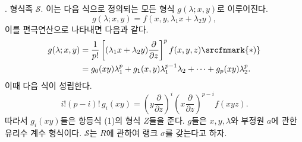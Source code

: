 
. 형식족 $\mathcal S$. 이는 다음 식으로 정의되는 모든 형식 $g(\lambda;x,y)$로 이루어진다.
\[
  g(\lambda;x,y)=f(x,y,\lambda_1x+\lambda_2y),
\]
이를 편극연산으로 나타내면 다음과 같다.
\[
\begin{aligned}
  g(\lambda;x,y)
  &=\frac1{p!}\left[(\lambda_1x+\lambda_2y)\frac{\partial}{\partial z}\right]^p f(x,y,z)\srcfnmark{*)} \\
  &=g_0(xy)\lambda_1^p+g_1(x,y)\lambda_1^{p-1}\lambda_2+\cdots+g_p(xy)\lambda_2^p.
\end{aligned}
\]
이때 다음 식이 성립한다.
\[
  i!(p-i)!\,g_i(xy)=
  \left(y\frac{\partial}{\partial z}\right)^i
  \left(x\frac{\partial}{\partial z}\right)^{p-i}f(xyz).
\]
따라서 $g_i(xy)$들은 항등식 (1)의 형식 $Z$들을 준다. $g$들은 $x,y,\lambda$와 부정원 $a$에 관한 유리수 계수 형식이다. $\mathcal S$는 $R$에 관하여 랭크 $\sigma$를 갖는다고 하자.
